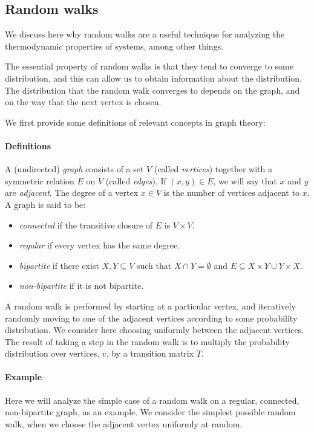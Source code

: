 \documentclass{article}
\begin{document}
\subsection{Random walks}
\label{sec:random_walks}
We discuss here why random walks are a useful technique for analyzing the thermodynamic properties of systems, among other things.

The essential property of random walks is that they tend to converge to some distribution, and this can allow us to obtain information about the distribution.
The distribution that the random walk converges to depends on the graph, and on the way that the next vertex is chosen.

We first provide some definitions of relevant concepts in graph theory:
\paragraph{Definitions}
A (undirected) \emph{graph} consists of a set $V$ (called \emph{vertices}) together with a symmetric relation $E$ on $V$ (called \emph{edges}).
If $(x, y) \in E$, we will say that $x$ and $y$ are \emph{adjacent}.
The degree of a vertex $x \in V$ is the number of vertices adjacent to $x$.
A graph is said to be:
\begin{itemize}
\item \emph{connected} if the transitive closure of $E$ is $V\times V$.
\item \emph{regular} if every vertex has the same degree.
\item \emph{bipartite} if there exist $X, Y \subseteq V$ such that $X\cap Y = \emptyset$ and $E \subseteq X\times Y \cup Y\times X$.
\item \emph{non-bipartite} if it is not bipartite.
\end{itemize}

A random walk is performed by starting at a particular vertex, and iteratively randomly moving to one of the adjacent vertices according to some probability distribution.
We consider here choosing uniformly between the adjacent vertices.
The result of taking a step in the random walk is to multiply the probability distribution over vertices, $v$, by a transition matrix $T$.

\paragraph{Example}
Here we will analyze the simple case of a random walk on a regular, connected, non-bipartite graph, as an example.
We consider the simplest possible random walk, when we choose the adjacent vertex uniformly at random.
\end{document}
